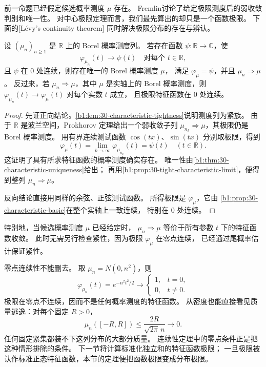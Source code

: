 前一命题已经假定候选概率测度 \(\mu\) 存在。
Fremlin\cite[285L--M]{Fremlin2016Measure}讨论了给定极限测度后的弱收敛判别和唯一性。
对中心极限定理而言，我们最先算出的却只是一个函数极限。
下面的[Lévy's continuity theorem]
同时解决极限分布的存在与辨认。

\begin{theorem}\label{b1:thm:30-levy-continuity}
设 \((\mu_n)_{n\geq1}\) 是 \(\mathbb R\) 上的 Borel 概率测度列。
若存在函数 \(\psi:\mathbb R\to\mathbb C\)，使
\[
 \varphi_{\mu_n}(t)\longrightarrow\psi(t)
 \quad\text{对每个 }t\in\mathbb R,
\]
且 \(\psi\) 在 \(0\) 处连续，则存在唯一的 Borel 概率测度 \(\mu\)，
满足 \(\varphi_\mu=\psi\)，并且 \(\mu_n\Rightarrow\mu\)。
反过来，若 \(\mu_n\Rightarrow\mu\)，其中 \(\mu\) 是实轴上的
Borel 概率测度，则
\(\varphi_{\mu_n}(t)\to\varphi_\mu(t)\) 对每个实数 \(t\) 成立，
且极限特征函数在 \(0\) 处连续。
\end{theorem}
\begin{proof}
先证正向结论。\cref{b1:lem:30-characteristic-tightness}说明测度列为紧族。
由于 \(\mathbb R\) 是波兰空间，Prokhorov 定理给出一个弱收敛子列
\(\mu_{n_k}\Rightarrow\mu\)，其极限仍是 Borel 概率测度。
用有界连续测试函数 \(\cos(tx)\)、\(\sin(tx)\) 分别取极限，得到
\[
 \varphi_\mu(t)=\lim_{k\to\infty}\varphi_{\mu_{n_k}}(t)=\psi(t)
 \quad(t\in\mathbb R).
\]
这证明了具有所求特征函数的概率测度确实存在。
唯一性由\cref{b1:thm:30-characteristic-uniqueness}给出；
再用\cref{b1:prop:30-tight-characteristic-limit}，便得到整列
\(\mu_n\Rightarrow\mu\)。

反向结论直接用同样的余弦、正弦测试函数。
所得极限是 \(\varphi_\mu\)，它由
\cref{b1:prop:30-characteristic-basic}在整个实轴上一致连续，
特别在 \(0\) 处连续。
\end{proof}

特别地，当候选概率测度 \(\mu\) 已经给定时，
\(\mu_n\Rightarrow\mu\) 等价于所有参数 \(t\) 下的特征函数收敛。
此时无需另行检查紧性，因为极限 \(\varphi_\mu\) 在零点连续，
已经通过尾概率估计保证紧性。

\ProseParagraphBreak

零点连续性不能删去。
取 \(\mu_n=N(0,n^2)\)，则
\[
 \varphi_{\mu_n}(t)=e^{-n^2t^2/2}
 \longrightarrow
 \begin{cases}
  1,&t=0,\\
  0,&t\ne0.
 \end{cases}
\]
极限在零点不连续，因而不是任何概率测度的特征函数。
从密度也能直接看见质量逃逸：对每个固定 \(R>0\)，
\[
 \mu_n([-R,R])
 \leq\frac{2R}{\sqrt{2\pi}\,n}\longrightarrow0.
\]
任何固定紧集都装不下这列分布的大部分质量。
连续性定理中的零点条件正是把这种情形排除的条件。
下一节将计算标准化独立和的特征函数极限；
一旦极限被认作标准正态特征函数，本节的定理便把函数极限变成分布极限。
